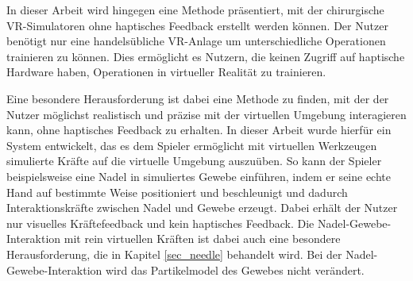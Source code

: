 \cite{VRHapticSim}

In dieser Arbeit wird hingegen eine Methode präsentiert, mit der chirurgische VR-Simulatoren ohne haptisches Feedback erstellt werden können. Der Nutzer benötigt nur eine handelsübliche VR-Anlage 
um unterschiedliche Operationen trainieren zu können. 
Dies ermöglicht es Nutzern, die keinen Zugriff auf haptische Hardware haben, Operationen in virtueller Realität zu trainieren. 

Eine besondere Herausforderung ist dabei eine Methode zu finden, mit der der Nutzer möglichst realistisch und präzise mit der virtuellen Umgebung interagieren kann, ohne haptisches Feedback zu erhalten. In dieser Arbeit wurde hierfür ein System entwickelt, das es dem Spieler ermöglicht mit virtuellen Werkzeugen simulierte Kräfte auf die virtuelle Umgebung auszuüben. So kann der Spieler beispielsweise eine Nadel in simuliertes Gewebe einführen, indem er seine echte Hand auf bestimmte Weise positioniert und beschleunigt und dadurch Interaktionskräfte zwischen Nadel und Gewebe erzeugt. 
Dabei erhält der Nutzer nur visuelles Kräftefeedback und kein haptisches Feedback.
Die Nadel-Gewebe-Interaktion mit rein virtuellen Kräften ist dabei auch eine besondere Herausforderung, die in Kapitel \ref{sec_needle} behandelt wird. 
Bei der Nadel-Gewebe-Interaktion wird das Partikelmodel des Gewebes nicht verändert. 








